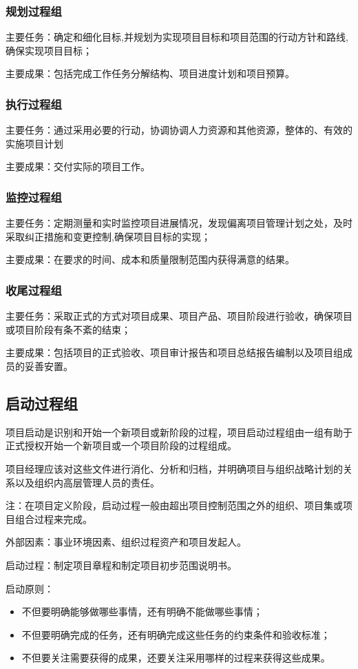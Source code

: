\subsubsection*{规划过程组}
主要任务：确定和细化目标,并规划为实现项目目标和项目范围的行动方针和路线,确保实现项目目标；
\par 主要成果：包括完成工作任务分解结构、项目进度计划和项目预算。
\subsubsection*{执行过程组}
主要任务：通过采用必要的行动，协调协调人力资源和其他资源，整体的、有效的实施项目计划
\par 主要成果：交付实际的项目工作。
\subsubsection*{监控过程组}
主要任务：定期测量和实时监控项目进展情况，发现偏离项目管理计划之处，及时采取纠正措施和变更控制,确保项目目标的实现；
\par 主要成果：在要求的时间、成本和质量限制范围内获得满意的结果。
\subsubsection*{收尾过程组}
主要任务：采取正式的方式对项目成果、项目产品、项目阶段进行验收，确保项目或项目阶段有条不紊的结束；
\par 主要成果：包括项目的正式验收、项目审计报告和项目总结报告编制以及项目组成员的妥善安置。
\subsection{启动过程组}
项目启动是识别和开始一个新项目或新阶段的过程，项目启动过程组由一组有助于正式授权开始一个新项目或一个项目阶段的过程组成。
\par 项目经理应该对这些文件进行消化、分析和归档，并明确项目与组织战略计划的关系以及组织内高层管理人员的责任。
\par 注：在项目定义阶段，启动过程一般由超出项目控制范围之外的组织、项目集或项目组合过程来完成。
\par 外部因素：事业环境因素、组织过程资产和项目发起人。
\par 启动过程：制定项目章程和制定项目初步范围说明书。
\par 启动原则：
\begin{itemize}
	\item 不但要明确能够做哪些事情，还有明确不能做哪些事情；
	\item 不但要明确完成的任务，还有明确完成这些任务的约束条件和验收标准；
	\item 不但要关注需要获得的成果，还要关注采用哪样的过程来获得这些成果。
\end{itemize}
